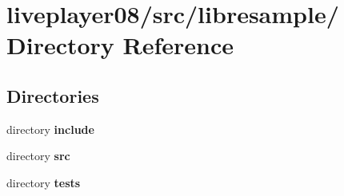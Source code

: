 \section{liveplayer08/src/libresample/ Directory Reference}
\label{dir_c94efe28ecdcb67f30ac9d29b308c58c}
\subsection*{Directories}
\begin{CompactItemize}
\item 
directory {\bf include}
\item 
directory {\bf src}
\item 
directory {\bf tests}
\end{CompactItemize}
